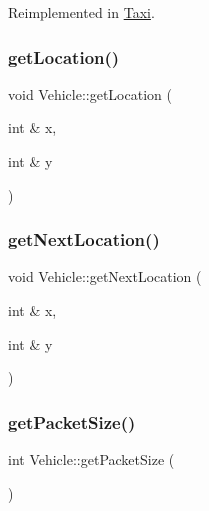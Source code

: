 Reimplemented in \hyperlink{class_taxi_a627cf1c475dd2bfafca59fceae551d09}{Taxi}.

\hypertarget{class_vehicle_a3dc4583c9a0bc76d0b82092d89e8bab8}{}\label{class_vehicle_a3dc4583c9a0bc76d0b82092d89e8bab8} 
\subsubsection{\texorpdfstring{get\+Location()}{getLocation()}}
{\footnotesize\ttfamily void Vehicle\+::get\+Location (\begin{DoxyParamCaption}\item[{int \&}]{x,  }\item[{int \&}]{y }\end{DoxyParamCaption})\hspace{0.3cm}{\ttfamily [inline]}}

\hypertarget{class_vehicle_abb74d1686a72682017d08a857cc2dae2}{}\label{class_vehicle_abb74d1686a72682017d08a857cc2dae2} 
\subsubsection{\texorpdfstring{get\+Next\+Location()}{getNextLocation()}}
{\footnotesize\ttfamily void Vehicle\+::get\+Next\+Location (\begin{DoxyParamCaption}\item[{int \&}]{x,  }\item[{int \&}]{y }\end{DoxyParamCaption})\hspace{0.3cm}{\ttfamily [inline]}}

\hypertarget{class_vehicle_a24d645b977cd08d10b759d34fedbc339}{}\label{class_vehicle_a24d645b977cd08d10b759d34fedbc339} 
\subsubsection{\texorpdfstring{get\+Packet\+Size()}{getPacketSize()}}
{\footnotesize\ttfamily int Vehicle\+::get\+Packet\+Size (\begin{DoxyParamCaption}{ }\end{DoxyParamCaption})\hspace{0.3cm}{\ttfamily [inline]}}

